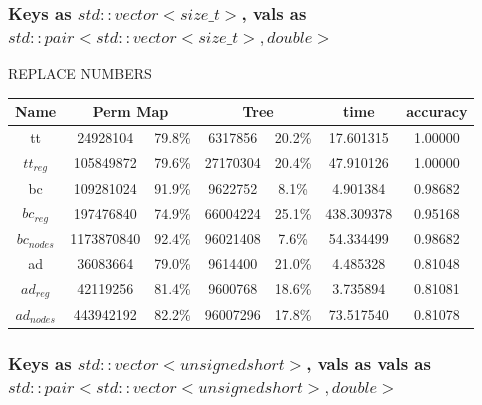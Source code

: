 \documentclass[]{article}
\theoremstyle{definition}
\begin{document}
\subsubsection{Keys as $std::vector<size\_t>$, vals as $std::pair<std::vector<size\_t>, double>$}

REPLACE NUMBERS

\begin{center}
\begin{tabular} { |c|c|c|c|c|c|c| }
\hline
Name & \multicolumn{2}{c|}{Perm Map} & \multicolumn{2}{c|}{Tree} & time & accuracy \\
\hline
tt & 24928104 & 79.8\%  & 6317856 & 20.2\% & 17.601315 & 1.00000 \\

$tt_{reg}$ & 105849872 & 79.6\% & 27170304 & 20.4\% & 47.910126 & 1.00000 \\

bc &109281024 & 91.9\% & 9622752 & 8.1\% & 4.901384 & 0.98682 \\

$bc_{reg}$ & 197476840 & 74.9\% & 66004224 & 25.1\% & 438.309378 & 0.95168 \\

$bc_{nodes}$ & 1173870840 & 92.4\% & 96021408 & 7.6\% & 54.334499 & 0.98682 \\

ad & 36083664 & 79.0\% & 9614400 & 21.0\% & 4.485328 & 0.81048 \\

$ad_{reg}$ & 42119256 & 81.4\% & 9600768 & 18.6\% & 3.735894 & 0.81081 \\

$ad_{nodes}$ & 443942192 & 82.2\% & 96007296 & 17.8\% & 73.517540 & 0.81078 \\
\hline
\end{tabular}
\end{center}

\subsubsection{Keys as $std::vector<unsigned short>$, vals as vals as $std::pair<std::vector<unsigned short>, double>$}
\end{document}
